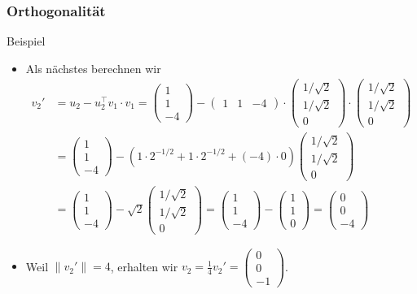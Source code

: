 \documentclass{beamer}
\newcommand\bc[1]{\left({#1}\right)}
\newcommand{\trans}{\top}
\renewcommand{\ae}{\"a}
\newcommand{\mytitle}{Orthogonalit\ae t}
\begin{document}
\begin{frame}\frametitle{\mytitle}
	\begin{block}{Beispiel}
	\begin{itemize}
\item Als n\ae chstes berechnen wir 
	\begin{align*}
		v_2'&=u_2-u_2^\trans v_1\cdot v_1=\begin{pmatrix}1\\1\\-4\end{pmatrix}-\begin{pmatrix}1&1&-4\end{pmatrix}\cdot\begin{pmatrix}1/\sqrt 2\\1/\sqrt 2\\0\end{pmatrix}\cdot\begin{pmatrix}1/\sqrt 2\\1/\sqrt 2\\0\end{pmatrix}\\
			&=\begin{pmatrix}1\\1\\-4\end{pmatrix}-\bc{1\cdot 2^{-1/2}+1\cdot 2^{-1/2}+(-4)\cdot 0}\begin{pmatrix}1/\sqrt 2\\1/\sqrt 2\\0\end{pmatrix}\\
			&=\begin{pmatrix}1\\1\\-4\end{pmatrix}-\sqrt 2\begin{pmatrix}1/\sqrt 2\\1/\sqrt 2\\0\end{pmatrix}
			=\begin{pmatrix}1\\1\\-4\end{pmatrix}-\begin{pmatrix}1\\1\\0\end{pmatrix}=\begin{pmatrix}0\\0\\-4\end{pmatrix}
	\end{align*}
	\item Weil $\|v_2'\|=4$, erhalten wir $ v_2=\frac{1}{4}v_2'=\begin{pmatrix}0\\0\\-1\end{pmatrix} $.
\end{itemize}
	\end{block}
\end{frame}
\end{document}
